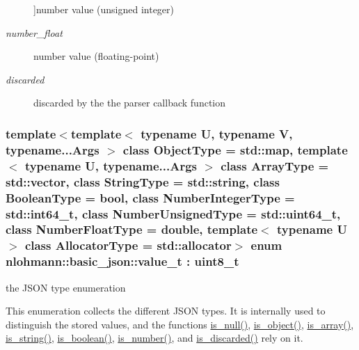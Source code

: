 \begin{Desc}
\begin{description}
{}]number value (unsigned integer) \item[{\em 
\hypertarget{classnlohmann_1_1basic__json_a231b02148577b69a154b2ce2c87a5522ad9966ecb59667235a57b4b999a649eef}{number\-\_\-float}\label{classnlohmann_1_1basic__json_a231b02148577b69a154b2ce2c87a5522ad9966ecb59667235a57b4b999a649eef}
}]number value (floating-\/point) \item[{\em 
\hypertarget{classnlohmann_1_1basic__json_a231b02148577b69a154b2ce2c87a5522a94708897ec9db8647dfe695714c98e46}{discarded}\label{classnlohmann_1_1basic__json_a231b02148577b69a154b2ce2c87a5522a94708897ec9db8647dfe695714c98e46}
}]discarded by the the parser callback function \end{description}
\end{Desc}
\hypertarget{classnlohmann_1_1basic__json_a231b02148577b69a154b2ce2c87a5522}{
\subsubsection[{value\-\_\-t}]{\setlength{\rightskip}{0pt plus 5cm}template$<$template$<$ typename U, typename V, typename...\-Args $>$ class Object\-Type = std\-::map, template$<$ typename U, typename...\-Args $>$ class Array\-Type = std\-::vector, class String\-Type  = std\-::string, class Boolean\-Type  = bool, class Number\-Integer\-Type  = std\-::int64\-\_\-t, class Number\-Unsigned\-Type  = std\-::uint64\-\_\-t, class Number\-Float\-Type  = double, template$<$ typename U $>$ class Allocator\-Type = std\-::allocator$>$ enum {\bf nlohmann\-::basic\-\_\-json\-::value\-\_\-t} \-: uint8\-\_\-t\hspace{0.3cm}{\ttfamily [strong]}}}\label{classnlohmann_1_1basic__json_a231b02148577b69a154b2ce2c87a5522}


the J\-S\-O\-N type enumeration 

This enumeration collects the different J\-S\-O\-N types. It is internally used to distinguish the stored values, and the functions \hyperlink{classnlohmann_1_1basic__json_a8abdfc0d6e051f6fa29d49da57bce631}{is\-\_\-null()}, \hyperlink{classnlohmann_1_1basic__json_a94ba313c00f1713fa4be85de64083754}{is\-\_\-object()}, \hyperlink{classnlohmann_1_1basic__json_a256a4cef002023acab3c9d75b569f54a}{is\-\_\-array()}, \hyperlink{classnlohmann_1_1basic__json_a409e854d754f5684b2cce74ee20dbc3b}{is\-\_\-string()}, \hyperlink{classnlohmann_1_1basic__json_adade77415e7f7bf08a9b5150c742714d}{is\-\_\-boolean()}, \hyperlink{classnlohmann_1_1basic__json_a957eb9594c7f0ca93212c30f3a400873}{is\-\_\-number()}, and \hyperlink{classnlohmann_1_1basic__json_a1002d187e05b5323bda5de124cbe95a8}{is\-\_\-discarded()} rely on it.

